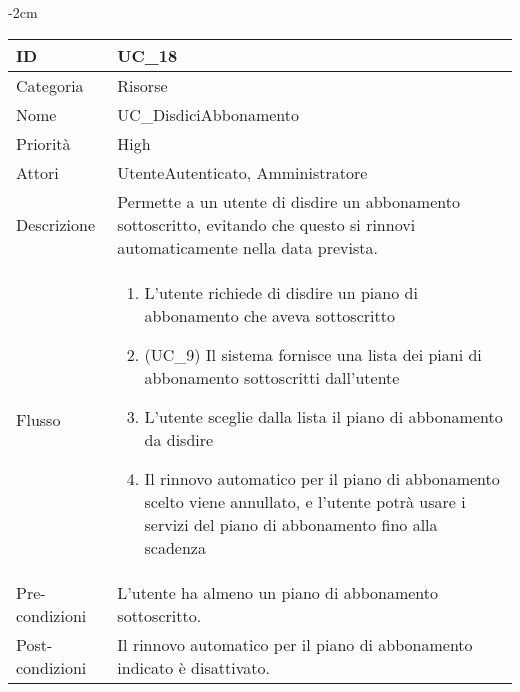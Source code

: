 \begin{center}
\begin{table}[bp]
    \centering
    \addtolength{\leftskip} {-2cm}
\begin{tabular}{ |p{2.6cm}|p{13cm}|  }
\hline
ID & UC\_18 \\\hline
Categoria & Risorse\\\hline
Nome & UC\_DisdiciAbbonamento\\\hline
Priorità & High \\\hline
Attori &  UtenteAutenticato, Amministratore \\\hline
Descrizione & Permette a un utente di disdire un abbonamento sottoscritto, evitando che questo si rinnovi automaticamente nella data prevista.\\\hline
Flusso &  	\begin{enumerate}
			\item L'utente richiede di disdire un piano di abbonamento che aveva sottoscritto
			\item (UC\_9) Il sistema fornisce una lista dei piani di abbonamento sottoscritti dall'utente
			\item L'utente sceglie dalla lista il piano di abbonamento da disdire
			\item Il rinnovo automatico per il piano di abbonamento scelto viene annullato, e l'utente potrà usare i servizi del piano di abbonamento fino alla scadenza
		\end{enumerate}\\\hline
Pre-condizioni & L'utente ha almeno un piano di abbonamento sottoscritto.\\\hline
Post-condizioni &  Il rinnovo automatico per il piano di abbonamento indicato è disattivato.\\\hline
\end{tabular}
\label{table_use_case:18}\newline
\end{table}


\end{center}
